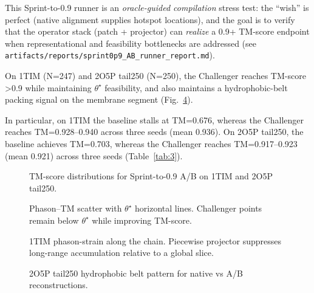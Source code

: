 This Sprint-to-0.9 runner is an \emph{oracle-guided compilation} stress test: the ``wish'' is perfect (native alignment supplies hotspot locations), and the goal is to verify that the operator stack (patch + projector) can \emph{realize} a 0.9+ TM-score endpoint when representational and feasibility bottlenecks are addressed (see \texttt{artifacts/reports/sprint0p9\_AB\_runner\_report.md}).

On 1TIM (N=247) and 2O5P tail250 (N=250), the Challenger reaches TM-score >0.9 while maintaining $\theta^\star$ feasibility, and also maintains a hydrophobic-belt packing signal on the membrane segment (Fig.~\ref{fig:12}).

\begin{table}[t]
  \centering
  \caption{Sprint-to-0.9 A/B outcomes (baseline vs challenger).}
  \label{tab:3}
\end{table}

In particular, on 1TIM the baseline stalls at TM=0.676, whereas the Challenger reaches TM=0.928--0.940 across three seeds (mean 0.936). On 2O5P tail250, the baseline achieves TM=0.703, whereas the Challenger reaches TM=0.917--0.923 (mean 0.921) across three seeds (Table~\ref{tab:3}).

\begin{figure}[t]
  \centering
  \caption{TM-score distributions for Sprint-to-0.9 A/B on 1TIM and 2O5P tail250.}
  \label{fig:9}
\end{figure}

\begin{figure}[t]
  \centering
  \caption{Phason–TM scatter with $\theta^\star$ horizontal lines. Challenger points remain below $\theta^\star$ while improving TM-score.}
  \label{fig:10}
\end{figure}

\begin{figure}[t]
  \centering
  \caption{1TIM phason-strain along the chain. Piecewise projector suppresses long-range accumulation relative to a global slice.}
  \label{fig:11}
\end{figure}

\begin{figure}[t]
  \centering
  \caption{2O5P tail250 hydrophobic belt pattern for native vs A/B reconstructions.}
  \label{fig:12}
\end{figure}

